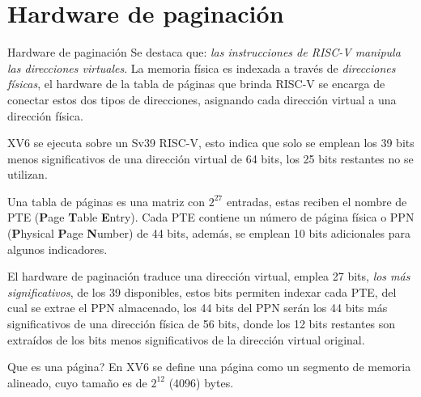 \documentclass{libs/ufc_format}
\begin{document}
\section{Hardware de paginación}
\begin{frame}{Hardware de paginación}
    Se destaca que: \emph{las instrucciones de RISC-V manipula las direcciones virtuales}. La memoria física es indexada a través de \emph{direcciones físicas}, el hardware de la tabla de páginas que brinda RISC-V se encarga de conectar estos dos tipos de direcciones, asignando cada dirección virtual a una dirección física.

    \vspace{0.3cm}

    XV6 se ejecuta sobre un Sv39 RISC-V, esto indica que solo se emplean los 39 bits menos significativos de una dirección virtual de 64 bits, los 25 bits restantes no se utilizan.
\end{frame}
\begin{frame}{}
     Una tabla de páginas  es una matriz con $2^{27}$ entradas, estas reciben el nombre de PTE (\textbf{P}age \textbf{T}able \textbf{E}ntry). Cada PTE contiene un número de página física o PPN (\textbf{P}hysical \textbf{P}age \textbf{N}umber) de 44 bits, además, se emplean 10 bits adicionales para algunos indicadores. 


    \vspace{0.3cm}
    
    El hardware de paginación traduce una dirección virtual, emplea 27 bits, \emph{los más significativos}, de los 39 disponibles, estos bits permiten indexar cada PTE, del cual se extrae el PPN almacenado, los 44 bits del PPN serán los 44 bits más significativos de una dirección física de 56 bits, donde los 12 bits restantes son extraídos de los bits menos significativos de la dirección virtual original.

    \begin{block}{Que es una página?}
        En XV6 se define una página como un segmento de memoria alineado, cuyo tamaño es de $2^{12}$ (4096) bytes. \cite{xv6_book}
    \end{block}
\end{frame}
\end{document}
